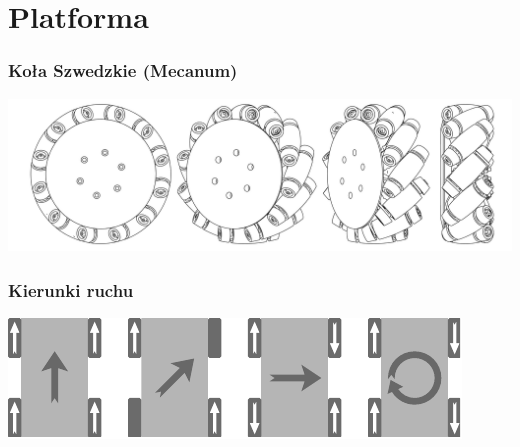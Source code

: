 \documentclass{beamer}
\begin{document}
	\section{Platforma}
	\begin{frame}
		\frametitle{Koła Szwedzkie (Mecanum)}
		\includegraphics[width=\textwidth]{graphics/wheel.pdf}
	\end{frame}
	\begin{frame}
		\frametitle{Kierunki ruchu}
		\includegraphics[width=\textwidth]{graphics/dirs.pdf}
	\end{frame}
\end{document}

